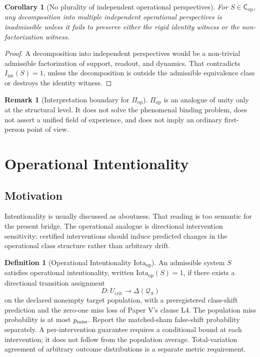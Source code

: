 \documentclass[11pt,a4paper]{article}
\newtheorem{corollary}[theorem]{Corollary}
\theoremstyle{definition}
\newtheorem{definition}[theorem]{Definition}
\newtheorem{remark}[theorem]{Remark}
\newcommand{\Cop}{\mathsf{C}_{\mathrm{op}}}
\newcommand{\Piop}{\Pi_{\mathrm{op}}}
\newcommand{\Iotaop}{\mathrm{Iota}_{\mathrm{op}}}
\newcommand{\Class}{\mathscr{Q}}
\newcommand{\Iint}{I_{\mathrm{int}}}
\newcommand{\crit}{\mathrm{crit}}
\begin{document}
\begin{corollary}[No plurality of independent operational perspectives]\label{cor:no-independent-perspectives}
For $S\in\Cop$, any decomposition into multiple independent operational perspectives is inadmissible unless it fails to preserve either the rigid identity witness or the non-factorization witness.
\end{corollary}

\begin{proof}
A decomposition into independent perspectives would be a non-trivial admissible factorization of support, readout, and dynamics. That contradicts $\Iint(S)=1$, unless the decomposition is outside the admissible equivalence class or destroys the identity witness.
\end{proof}

\begin{remark}[Interpretation boundary for $\Piop$]
$\Piop$ is an analogue of unity only at the structural level. It does not solve the phenomenal binding problem, does not assert a unified field of experience, and does not imply an ordinary first-person point of view.
\end{remark}

\section{Operational Intentionality}

\subsection{Motivation}
Intentionality is usually discussed as aboutness. That reading is too semantic for the present bridge. The operational analogue is directional intervention sensitivity: certified interventions should induce predicted changes in the operational class structure rather than arbitrary drift.

\begin{definition}[Operational Intentionality $\Iotaop$]\label{def:iota-op}
An admissible system $S$ satisfies operational intentionality, written $\Iotaop(S)=1$, if there exists a directional transition assignment
\[
D:U_{\crit}\to \Delta(\Class_S)
\]
on the declared nonempty target population, with a preregistered class-shift prediction and the zero-one miss loss of Paper V's clause L4. The population miss probability is at most $p_{\rm miss}$. Report the matched-sham false-shift probability separately. A per-intervention guarantee requires a conditional bound at each intervention; it does not follow from the population average. Total-variation agreement of arbitrary outcome distributions is a separate metric requirement.
\end{definition}
\end{document}
